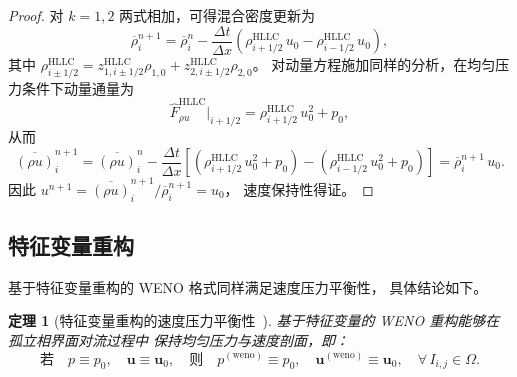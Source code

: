 \documentclass[12pt,a4paper]{article}
\newtheorem{theorem}{定理}[section]
\numberwithin{equation}{section}    %
\begin{document}
\begin{proof}
对 $k=1,2$ 两式相加，可得混合密度更新为
\begin{equation}
    \overline{\rho}_i^{n+1}
    = \overline{\rho}_i^n
    - \frac{\Delta t}{\Delta x}\left(
        \rho_{i+1/2}^{\mathrm{HLLC}}\,u_0
        - \rho_{i-1/2}^{\mathrm{HLLC}}\,u_0
    \right),
\end{equation}
其中 $\rho_{i\pm 1/2}^{\mathrm{HLLC}} = z_{1,i\pm 1/2}^{\mathrm{HLLC}}\rho_{1,0}
+ z_{2,i\pm 1/2}^{\mathrm{HLLC}}\rho_{2,0}$。
对动量方程施加同样的分析，在均匀压力条件下动量通量为
\begin{equation}
    \hat{F}^{\mathrm{HLLC}}_{\rho u}\big|_{i+1/2}
    = \rho_{i+1/2}^{\mathrm{HLLC}}\,u_0^2 + p_0,
\end{equation}
从而
\begin{equation}
    \overline{(\rho u)}_i^{n+1}
    = \overline{(\rho u)}_i^n
    - \frac{\Delta t}{\Delta x}
    \left[
        \left(\rho_{i+1/2}^{\mathrm{HLLC}}\,u_0^2 + p_0\right)
        - \left(\rho_{i-1/2}^{\mathrm{HLLC}}\,u_0^2 + p_0\right)
    \right]
    = \overline{\rho}_i^{n+1}\,u_0.
\end{equation}
因此 $u^{n+1} = \overline{(\rho u)}_i^{n+1} / \overline{\rho}_i^{n+1} = u_0$，
速度保持性得证。
\end{proof}

\subsection{特征变量重构}
基于特征变量重构的 WENO 格式同样满足速度压力平衡性，
具体结论如下。

\begin{theorem}[特征变量重构的速度压力平衡性~\cite{zhang2023physical}]
    \label{thm:char}
    基于特征变量的 WENO 重构能够在孤立相界面对流过程中
    保持均匀压力与速度剖面，即：
    \begin{equation}
        \text{若}\quad p \equiv p_0,\quad \bm{u} \equiv \bm{u}_0,
        \quad\text{则}\quad
        p^{(\mathrm{weno})} \equiv p_0,\quad
        \bm{u}^{(\mathrm{weno})} \equiv \bm{u}_0,
        \quad \forall\, I_{i,j} \in \Omega.
    \end{equation}
\end{theorem}
\end{document}
